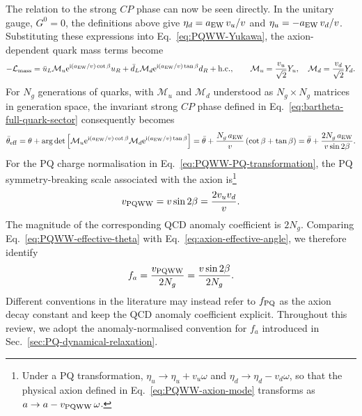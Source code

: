 \documentclass[review]{elsarticle}
\numberwithin{equation}{section}
\numberwithin{table}{section}
\numberwithin{figure}{section}
\def\i{\mathrm{i}}
\def\e{\mathrm{e}}
\def\M{\mathcal{M}}
\def\hc{{\rm h.c.}}
\begin{document}
The relation to the strong $CP$ phase can now be seen directly. In the unitary gauge, $G^0=0$, the definitions above give
$\eta_d=a_{\rm EW}\,v_u/v$ and $\eta_u=-a_{\rm EW}\,v_d/v$.
Substituting these expressions into Eq.~\eqref{eq:PQWW-Yukawa}, the axion-dependent quark mass terms become
\begin{align}
    -\mathcal{L}_{\rm mass} = \bar u_L\M_u \e^{\i(a_{\rm EW}/v)\cot\beta} u_R + \bar d_L\M_d \e^{\i(a_{\rm EW}/v)\tan\beta} d_R +\hc ,
    \qquad
    \M_u = \frac{v_u}{\sqrt{2}}Y_u,
    \quad
    \M_d = \frac{v_d}{\sqrt{2}}Y_d.
    \label{eq:PQWW-axion-mass-phases}
\end{align}
For $N_g$ generations of quarks, with $\M_u$ and $\M_d$ understood as $N_g\times N_g$ matrices in generation space, the invariant strong $CP$ phase defined in Eq.~\eqref{eq:bartheta-full-quark-sector} consequently becomes
\begin{align}
    \bar\theta_{\rm eff}
    = \theta + \arg\det \left[\M_u\e^{\i(a_{\rm EW}/v)\cot\beta}\M_d \e^{\i(a_{\rm EW}/v)\tan\beta}
    \right] = \bar\theta + \frac{N_g\,a_{\rm EW}}{v}
    \left(\cot\beta+\tan\beta \right)
    = \bar\theta + \frac{2N_g\,a_{\rm EW}}{v\sin2\beta}.
    \label{eq:PQWW-effective-theta}
\end{align}
For the PQ charge normalisation in Eq.~\eqref{eq:PQWW-PQ-transformation}, the PQ symmetry-breaking scale associated with the axion is\footnote{Under a PQ transformation, $\eta_u\rightarrow\eta_u+v_u\omega$ and $\eta_d\rightarrow\eta_d-v_d\omega$, so that the physical axion defined in Eq.~\eqref{eq:PQWW-axion-mode} transforms as $a\rightarrow a-v_{\rm PQWW}\,\omega$.}
\begin{align}
    v_{\rm PQWW} = v\sin2\beta = \frac{2v_uv_d}{v}.
    \label{eq:PQWW-fPQ}
\end{align}
The magnitude of the corresponding QCD anomaly coefficient is $2N_g$. Comparing Eq.~\eqref{eq:PQWW-effective-theta} with Eq.~\eqref{eq:axion-effective-angle}, we therefore identify
\begin{align}
    f_a = \frac{v_{\rm PQWW}}{2N_g} = \frac{v\sin2\beta}{2N_g}.
    \label{eq:PQWW-fa}
\end{align}
Different conventions in the literature may instead refer to $f_{\rm PQ}$ as the axion decay constant and keep the QCD anomaly coefficient explicit. Throughout this review, we adopt the anomaly-normalised convention for $f_a$ introduced in Sec.~\ref{sec:PQ-dynamical-relaxation}.
\end{document}
